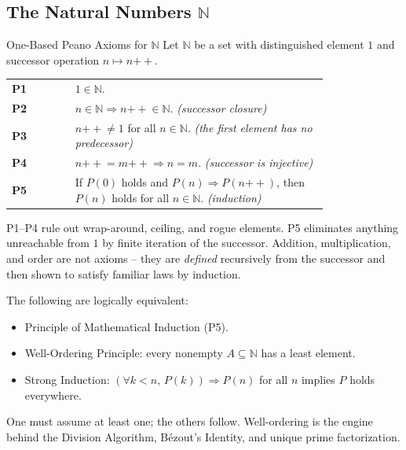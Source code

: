 

\subsection*{The Natural Numbers $\mathbb{N}$}

\begin{axiombox}{One-Based Peano Axioms for $\mathbb{N}$}
Let $\mathbb{N}$ be a set with distinguished element $1$
and successor operation $n \mapsto n{+\!\!+}$.

\medskip
\begin{tabular}{@{} l p{0.80\linewidth} @{}}
\textbf{P1} & $1 \in \mathbb{N}$. \\[4pt]
\textbf{P2} & $n \in \mathbb{N} \Rightarrow n{+\!\!+} \in \mathbb{N}$.
             \hfill\textit{(successor closure)} \\[4pt]
\textbf{P3} & $n{+\!\!+} \neq 1$ for all $n \in \mathbb{N}$.
             \hfill\textit{(the first element has no predecessor)} \\[4pt]
\textbf{P4} & $n{+\!\!+} = m{+\!\!+} \Rightarrow n = m$.
             \hfill\textit{(successor is injective)} \\[4pt]
\textbf{P5} & If $P(0)$ holds and $P(n) \Rightarrow P(n{+\!\!+})$,
             then $P(n)$ holds for all $n \in \mathbb{N}$.
             \hfill\textit{(induction)} \\
\end{tabular}
\end{axiombox}

\begin{remark*}
P1--P4 rule out wrap-around, ceiling, and rogue elements.
P5 eliminates anything unreachable from $1$ by finite iteration of the
successor.
Addition, multiplication, and order are not axioms -- they are \emph{defined}
recursively from the successor and then shown to satisfy familiar laws by
induction.
\end{remark*}

\begin{remark*}
The following are logically equivalent:
\begin{itemize}
  \item Principle of Mathematical Induction (P5).
  \item Well-Ordering Principle: every nonempty $A \subseteq \mathbb{N}$
        has a least element.
  \item Strong Induction: $(\forall k < n,\, P(k)) \Rightarrow P(n)$
        for all $n$ implies $P$ holds everywhere.
\end{itemize}
One must assume at least one; the others follow.
Well-ordering is the engine behind the Division Algorithm, Bézout's Identity,
and unique prime factorization.
\end{remark*}

